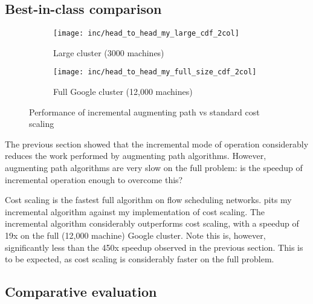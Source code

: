 
\subsection{Best-in-class comparison}

\begin{figure}
    \begin{widepage}
        \begin{subfigure}[c]{0.5\textwidth}
            \texttt{[image: inc/head\_to\_head\_my\_large\_cdf\_2col]}
            \caption{Large cluster (3000 machines)}
        \end{subfigure}
        \begin{subfigure}[c]{0.5\textwidth}
            \texttt{[image: inc/head\_to\_head\_my\_full\_size\_cdf\_2col]}
            \caption{Full Google cluster (12,000 machines)}
        \end{subfigure}
    \end{widepage}
    \caption{Performance of incremental augmenting path vs standard cost scaling}
    \label{fig:inc-head-to-head-my}
\end{figure}

The previous section showed that the incremental mode of operation considerably reduces the work performed by augmenting path algorithms. However, augmenting path algorithms are very slow on the full problem\footnotemark: is the speedup of incremental operation enough to overcome this?

Cost scaling is the fastest full algorithm on flow scheduling networks.   pits my incremental algorithm against my implementation of cost scaling. The incremental algorithm considerably outperforms cost scaling, with a speedup of 19x on the full (12,000 machine) Google cluster. Note this is, however, significantly less than the 450x speedup observed in the previous section. This is to be expected, as cost scaling is considerably faster on the full problem.

\subsection{Comparative evaluation}

